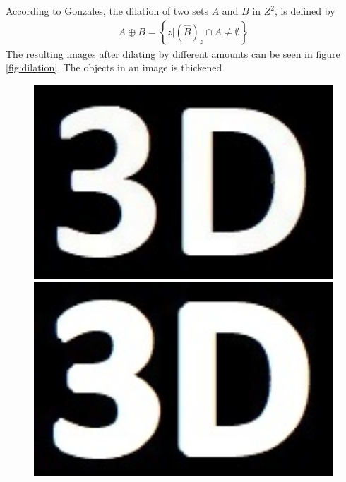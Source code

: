 According to Gonzales, the dilation of two sets $A$ and $B$ in $Z^2$, is defined by
\begin{align*}
	A \oplus B = \left\{z \big| (\hat{B})_z \cap A \neq \emptyset \right\}
\end{align*}
The resulting images after dilating by different amounts can be seen in figure \ref{fig:dilation}. The objects in an image is thickened 
\begin{figure}[h!]
	\centering
	\begin{minipage}[t]{0.24\textwidth}
		\centering
		\includegraphics[width=1\textwidth]{figures/ImageAnalysis/Reconstruct/reconstruct_3D.jpg}
	\end{minipage}
	\begin{minipage}[t]{0.24\textwidth}
		\centering	
		\includegraphics[width=1\textwidth]{figures/ImageAnalysis/Reconstruct/3D_Dilate_Cross.jpg}
	\end{minipage}
	\begin{minipage}[t]{0.24\textwidth}

\end{minipage}
\end{figure}
